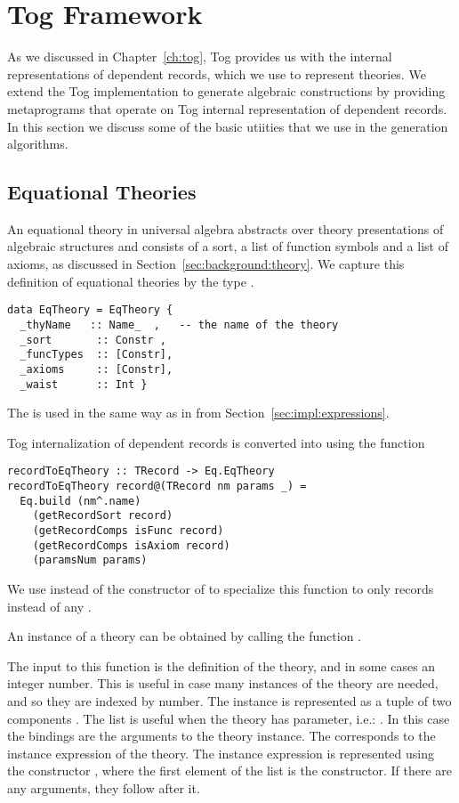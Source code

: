 \section{Tog Framework}
\label{sec:togFamework}

As we discussed in Chapter~\ref{ch:tog}, Tog provides us with the internal representations of dependent records, which we use to represent theories. We extend the Tog implementation to generate algebraic constructions by providing metaprograms that operate on Tog internal representation of dependent records. In this section we discuss some of the basic utiities that we use in the generation algorithms. 

\subsection{Equational Theories}
An equational theory in universal algebra abstracts over theory presentations of algebraic structures and consists of a sort, a list of function symbols and a list of axioms, as discussed in Section~\ref{sec:background:theory}. We capture this definition of equational theories by the type . 
\begin{verbatim}
data EqTheory = EqTheory {
  _thyName   :: Name_  ,   -- the name of the theory 
  _sort       :: Constr ,      
  _funcTypes  :: [Constr],
  _axioms     :: [Constr],
  _waist      :: Int }
\end{verbatim}
The  is used in the same way as in  from Section~\ref{sec:impl:expressions}. 

Tog internalization of dependent records is converted into  using the function 
\begin{verbatim}
recordToEqTheory :: TRecord -> Eq.EqTheory
recordToEqTheory record@(TRecord nm params _) =
  Eq.build (nm^.name) 
    (getRecordSort record)
    (getRecordComps isFunc record)
    (getRecordComps isAxiom record)
    (paramsNum params)
\end{verbatim}
We use  instead of the  constructor of  to specialize this function to only records instead of any .

An instance of a theory can be obtained by calling the function . 

The input to this function is the definition of the theory, and in some cases an integer number. This is useful in case many instances of the theory are needed, and so they are indexed by number. The instance is represented as a tuple of two components . The  list is useful when the theory has parameter, i.e.: . In this case the  bindings are the arguments to the theory instance. The  corresponds to the instance expression of the theory. The instance expression is represented using the constructor , where the first element of the list is the constructor. If there are any arguments, they follow after it. 


